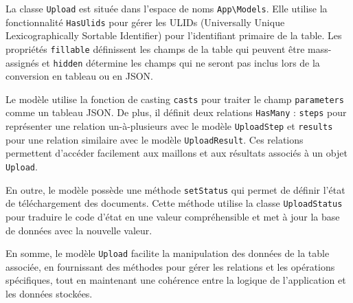 La classe \Verb|Upload| est située dans l'espace de noms \Verb|App\Models|. Elle utilise la fonctionnalité \Verb|HasUlids| pour gérer les ULIDs (Universally Unique Lexicographically Sortable Identifier) pour l'identifiant primaire de la table. Les propriétés \Verb|fillable| définissent les champs de la table qui peuvent être mass-assignés et \Verb|hidden| détermine les champs qui ne seront pas inclus lors de la conversion en tableau ou en JSON.

Le modèle utilise la fonction de casting \Verb|casts| pour traiter le champ \Verb|parameters| comme un tableau JSON. De plus, il définit deux relations \Verb|HasMany| : \Verb|steps| pour représenter une relation un-à-plusieurs avec le modèle \Verb|UploadStep| et \Verb|results| pour une relation similaire avec le modèle \Verb|UploadResult|. Ces relations permettent d'accéder facilement aux maillons et aux résultats associés à un objet \Verb|Upload|.

En outre, le modèle possède une méthode \Verb|setStatus| qui permet de définir l'état de téléchargement des documents. Cette méthode utilise la classe \Verb|UploadStatus| pour traduire le code d'état en une valeur compréhensible et met à jour la base de données avec la nouvelle valeur.

En somme, le modèle \Verb|Upload| facilite la manipulation des données de la table associée, en fournissant des méthodes pour gérer les relations et les opérations spécifiques, tout en maintenant une cohérence entre la logique de l'application et les données stockées.